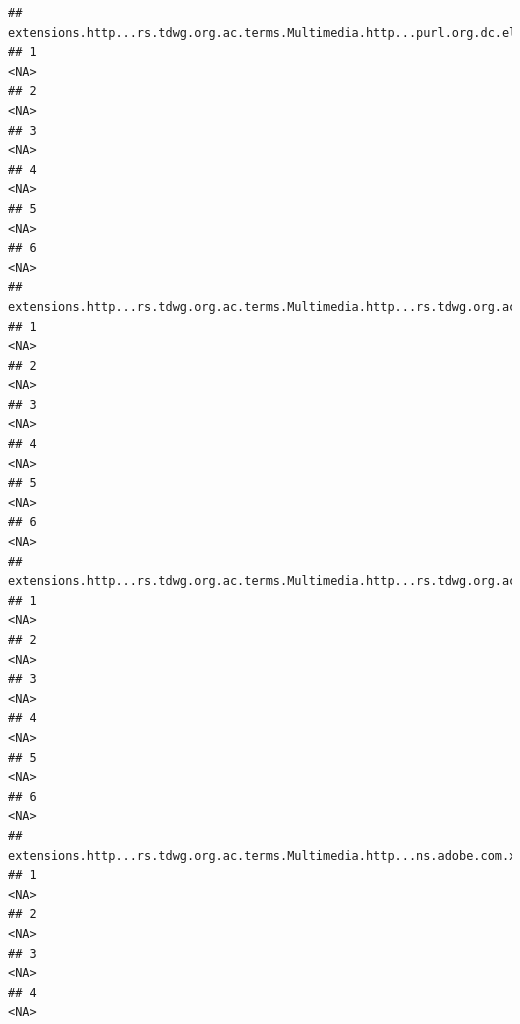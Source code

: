 \documentclass[
]{book}
\begin{document}
\begin{verbatim}
##   extensions.http...rs.tdwg.org.ac.terms.Multimedia.http...purl.org.dc.elements.1.1.type.2
## 1                                                                                     <NA>
## 2                                                                                     <NA>
## 3                                                                                     <NA>
## 4                                                                                     <NA>
## 5                                                                                     <NA>
## 6                                                                                     <NA>
##   extensions.http...rs.tdwg.org.ac.terms.Multimedia.http...rs.tdwg.org.ac.terms.subjectPart.2
## 1                                                                                        <NA>
## 2                                                                                        <NA>
## 3                                                                                        <NA>
## 4                                                                                        <NA>
## 5                                                                                        <NA>
## 6                                                                                        <NA>
##   extensions.http...rs.tdwg.org.ac.terms.Multimedia.http...rs.tdwg.org.ac.terms.associatedObservationReference.2
## 1                                                                                                           <NA>
## 2                                                                                                           <NA>
## 3                                                                                                           <NA>
## 4                                                                                                           <NA>
## 5                                                                                                           <NA>
## 6                                                                                                           <NA>
##   extensions.http...rs.tdwg.org.ac.terms.Multimedia.http...ns.adobe.com.xap.1.0.rights.UsageTerms.2
## 1                                                                                              <NA>
## 2                                                                                              <NA>
## 3                                                                                              <NA>
## 4                                                                                              <NA>

\end{verbatim}
\end{document}
